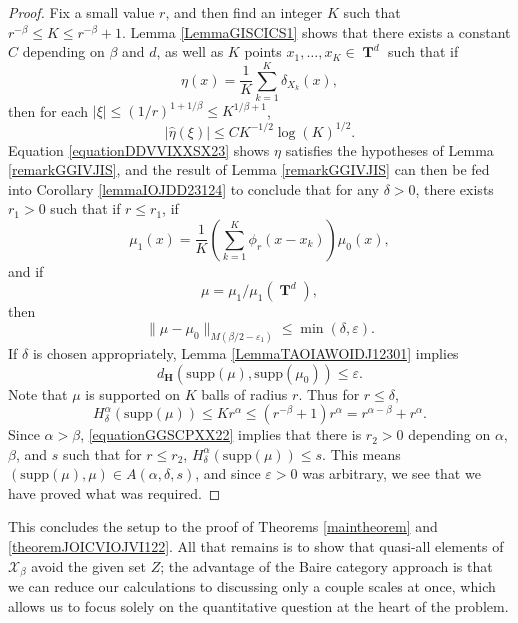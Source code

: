 \documentclass[12pt,reqno]{article}
\numberwithin{equation}{section}
\DeclareMathOperator{\TT}{\mathbf{T}}
\numberwithin{theorem}{section}
\begin{document}
\begin{proof}
    Fix a small value $r$, and then find an integer $K$ such that $r^{-\beta} \leq K \leq r^{-\beta} + 1$. Lemma \ref{LemmaGISCICS1} shows that there exists a constant $C$ depending on $\beta$ and $d$, as well as $K$ points $x_1, \dots, x_K \in \TT^d$ such that if
    \[ \eta(x) = \frac{1}{K} \sum_{k = 1}^K \delta_{X_k}(x), \]
    then for each $|\xi| \leq (1/r)^{1 + 1/\beta} \leq K^{1/\beta + 1}$,
    \begin{equation} \label{equationDDVVIXXSX23}
        |\widehat{\eta}(\xi)| \leq C K^{-1/2} \log(K)^{1/2}.
    \end{equation}
    Equation \eqref{equationDDVVIXXSX23} shows $\eta$ satisfies the hypotheses of Lemma \ref{remarkGGIVJIS}, and the result of Lemma \ref{remarkGGIVJIS} can then be fed into Corollary \ref{lemmaIOJDD23124} to conclude that for any $\delta > 0$, there exists $r_1 > 0$ such that if $r \leq r_1$, if
    \[ \mu_1(x) = \frac{1}{K} \left( \sum_{k = 1}^K \phi_{r}(x - x_k) \right) \mu_0(x), \]
    and if
    \[ \mu = \mu_1 / \mu_1(\TT^d), \]
    then
    \begin{equation} \label{equationYYUDUSC4434}
        \| \mu - \mu_0 \|_{M(\beta/2 - \varepsilon_1)} \leq \min(\delta,\varepsilon).
    \end{equation}
    If $\delta$ is chosen appropriately, Lemma \ref{LemmaTAOIAWOIDJ12301} implies
    \begin{equation}
        d_{\mathbf{H}}(\text{supp}(\mu),\text{supp}(\mu_0)) \leq \varepsilon.
    \end{equation}
    Note that $\mu$ is supported on $K$ balls of radius $r$. Thus for $r \leq \delta$,
    \begin{equation} \label{equationGGSCPXX22}
        H^\alpha_\delta(\text{supp}(\mu)) \leq K r^\alpha \leq (r^{-\beta} + 1) r^\alpha = r^{\alpha - \beta} + r^\alpha.
    \end{equation}
    Since $\alpha > \beta$, \eqref{equationGGSCPXX22} implies that there is $r_2 > 0$ depending on $\alpha$, $\beta$, and $s$ such that for $r \leq r_2$, $H^\alpha_\delta(\text{supp}(\mu)) \leq s$. This means $(\text{supp}(\mu),\mu) \in A(\alpha,\delta,s)$, and since $\varepsilon > 0$ was arbitrary, we see that we have proved what was required.
\end{proof}

This concludes the setup to the proof of Theorems \ref{maintheorem} and \ref{theoremJOICVIOJVI122}. All that remains is to show that quasi-all elements of $\mathcal{X}_\beta$ avoid the given set $Z$; the advantage of the Baire category approach is that we can reduce our calculations to discussing only a couple scales at once, which allows us to focus solely on the quantitative question at the heart of the problem.
\end{document}

